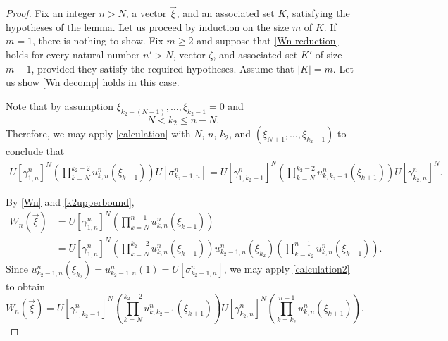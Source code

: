 \documentclass[12pt]{amsart}
\numberwithin{equation}{section}
\theoremstyle{definition}
\theoremstyle{remark}
\begin{document}
\begin{proof}
	Fix an integer $n>N$, a vector $\vec{\xi}$, and an associated set $K$, satisfying the hypotheses of the lemma. Let us proceed by induction on the size $m$ of $K$. If $m=1$, there is nothing to show. Fix $m\geq 2$ and suppose that \autoref{Wn reduction} holds for every natural number $n'>N$, vector $\zeta$, and associated set $K'$ of size $m-1$, provided they satisfy the required hypotheses. Assume that $|K|=m$. Let us show \autoref{Wn decomp} holds in this case.
	
	Note that by assumption $\xi_{k_{2}-(N-1)},\ldots,\xi_{k_{2}-1}=0$ and
	\begin{equation}
	\label{k2upperbound}
	N<k_{2}\leq n-N.
	\end{equation}
	Therefore, we may apply \autoref{calculation} with $N$, $n$, $k_{2}$, and $(\xi_{N+1},\ldots,\xi_{k_{2}-1})$ to conclude that
	\begin{equation}
	\label{calculation2}
		\begin{aligned}
			U[\gamma^{n}_{1,n}]^{N}\left(\prod_{k=N}^{k_{2}-2}u^{n}_{k,n}(\xi_{k+1})\right)U[\sigma^{n}_{k_{2}-1,n}]
			=U[\gamma^{n}_{1,k_{2}-1}]^{N}\left(\prod_{k=N}^{k_{2}-2}u^{n}_{k,k_{2}-1}(\xi_{k+1})\right)U[\gamma^{n}_{k_{2},n}]^{N}.
		\end{aligned}
	\end{equation}
	
	By \autoref{Wn} and \autoref{k2upperbound},  
	$$
	\begin{aligned}
	W_{n}(\vec{\xi})&=U[\gamma^{n}_{1,n}]^{N}\left(\prod_{k=N}^{n-1}u^{n}_{k,n}(\xi_{k+1})\right)\\
	&=U[\gamma^{n}_{1,n}]^{N}\left(\prod_{k=N}^{k_{2}-2}u^{n}_{k,n}(\xi_{k+1})\right)u^{n}_{k_{2}-1,n}(\xi_{k_{2}})\left(\prod_{k=k_{2}}^{n-1}u^{n}_{k,n}(\xi_{k+1})\right).
	\end{aligned}
	$$
	Since $u^{n}_{k_{2}-1,n}(\xi_{k_{2}})=u^{n}_{k_{2}-1,n}(1)=U[\sigma^{n}_{k_{2}-1,n}]$, we  may apply \autoref{calculation2} to obtain
	\begin{equation}
	\label{induction}
	W_{n}(\vec{\xi})=U[\gamma^{n}_{1,k_{2}-1}]^{N}\left(\prod_{k=N}^{k_{2}-2}u^{n}_{k,k_{2}-1}(\xi_{k+1})\right)U[\gamma^{n}_{k_{2},n}]^{N}\left(\prod_{k=k_{2}}^{n-1}u^{n}_{k,n}(\xi_{k+1})\right).
	\end{equation}
	

\end{proof}
\end{document}
